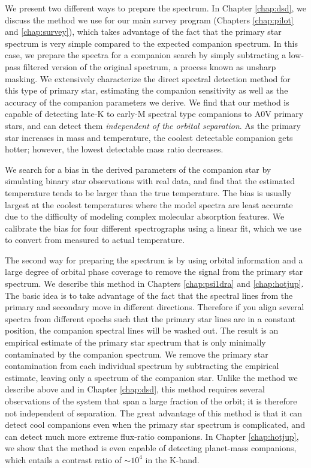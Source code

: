 \documentclass{utthesis}
\begin{document}
We present two different ways to prepare the spectrum. In Chapter \ref{chap:dsd}, we discuss the method we use for our main survey program (Chapters \ref{chap:pilot} and \ref{chap:survey}), which takes advantage of the fact that the primary star spectrum is very simple compared to the expected companion spectrum. In this case, we prepare the spectra for a companion search by simply subtracting a low-pass filtered version of the original spectrum, a process known as unsharp masking. We extensively characterize the direct spectral detection method for this type of primary star, estimating the companion sensitivity as well as the accuracy of the companion parameters we derive. We find that our method is capable of detecting late-K to early-M spectral type companions to A0V primary stars, and can detect them \emph{independent of the orbital separation}. As the primary star increases in mass and temperature, the coolest detectable companion gets hotter; however, the lowest detectable mass ratio decreases. 

We search for a bias in the derived parameters of the companion star by simulating binary star observations with real data, and find that the estimated temperature tends to be larger than the true temperature. The bias is usually largest at the coolest temperatures where the model spectra are least accurate due to the difficulty of modeling complex molecular absorption features. We calibrate the bias for four different spectrographs using a linear fit, which we use to convert from measured to actual temperature.

The second way for preparing the spectrum is by using orbital information and a large degree of orbital phase coverage to remove the signal from the primary star spectrum. We describe this method in Chapters \ref{chap:psi1dra} and \ref{chap:hotjup}. The basic idea is to take advantage of the fact that the spectral lines from the primary and secondary move in different directions. Therefore if you align several spectra from different epochs such that the primary star lines are in a constant position, the companion spectral lines will be washed out. The result is an empirical estimate of the primary star spectrum that is only minimally contaminated by the companion spectrum. We remove the primary star contamination from each individual spectrum by subtracting the empirical estimate, leaving only a spectrum of the companion star. Unlike the method we describe above and in Chapter \ref{chap:dsd}, this method requires several observations of the system that span a large fraction of the orbit; it is therefore not independent of separation. The great advantage of this method is that it can detect cool companions even when the primary star spectrum is complicated, and can detect much more extreme flux-ratio companions. In Chapter \ref{chap:hotjup}, we show that the method is even capable of detecting planet-mass companions, which entails a contrast ratio of $\sim 10^4$ in the K-band.
\end{document}
